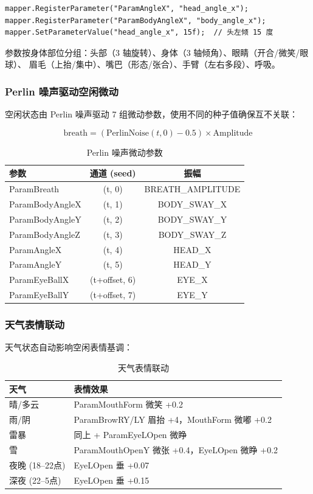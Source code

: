 \documentclass[12pt,a4paper]{ctexart}
\begin{document}
\begin{lstlisting}[style=csharp,caption={参数映射示例},label={lst:param-mapping}]
mapper.RegisterParameter("ParamAngleX", "head_angle_x");
mapper.RegisterParameter("ParamBodyAngleX", "body_angle_x");
mapper.SetParameterValue("head_angle_x", 15f);  // 头左倾 15 度
\end{lstlisting}

参数按身体部位分组：头部（3 轴旋转）、身体（3 轴倾角）、眼睛（开合/微笑/眼球）、
眉毛（上抬/集中）、嘴巴（形态/张合）、手臂（左右多段）、呼吸。

\subsubsection{Perlin 噪声驱动空闲微动}

空闲状态由 Perlin 噪声驱动 7 组微动参数，使用不同的种子值确保互不关联：

\[
\text{breath} = (\text{PerlinNoise}(t, 0) - 0.5) \times \text{Amplitude}
\]

\begin{table}[H]
\centering
\caption{Perlin 噪声微动参数}
\label{tab:perlin}
\begin{tabular}{lcc}
\toprule
\textbf{参数} & \textbf{通道 (seed)} & \textbf{振幅} \\
\midrule
ParamBreath & (t, 0) & BREATH\_AMPLITUDE \\
ParamBodyAngleX & (t, 1) & BODY\_SWAY\_X \\
ParamBodyAngleY & (t, 2) & BODY\_SWAY\_Y \\
ParamBodyAngleZ & (t, 3) & BODY\_SWAY\_Z \\
ParamAngleX & (t, 4) & HEAD\_X \\
ParamAngleY & (t, 5) & HEAD\_Y \\
ParamEyeBallX & (t+offset, 6) & EYE\_X \\
ParamEyeBallY & (t+offset, 7) & EYE\_Y \\
\bottomrule
\end{tabular}
\end{table}

\subsubsection{天气表情联动}

天气状态自动影响空闲表情基调：

\begin{table}[H]
\centering
\caption{天气表情联动}
\label{tab:weather-face}
\begin{tabular}{ll}
\toprule
\textbf{天气} & \textbf{表情效果} \\
\midrule
晴/多云 & ParamMouthForm 微笑 +0.2 \\
雨/阴 & ParamBrowRY/LY 眉抬 +4，MouthForm 微嘟 +0.2 \\
雷暴 & 同上 + ParamEyeLOpen 微睁 \\
雪 & ParamMouthOpenY 微张 +0.4，EyeLOpen 微睁 +0.2 \\
夜晚 (18--22点) & EyeLOpen 垂 +0.07 \\
深夜 (22--5点) & EyeLOpen 垂 +0.15 \\
\bottomrule
\end{tabular}
\end{table}
\end{document}
